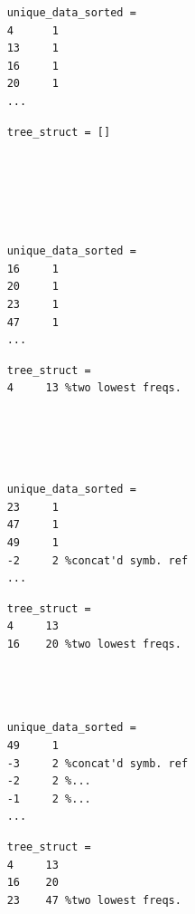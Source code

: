 \documentclass[12pt]{article}
\begin{document}
\begin{figure}[H]
\begin{minipage}{0.5\textwidth}
\begin{verbatim}
	unique_data_sorted =
	4      1
	13     1
	16     1
	20     1
	...
	\end{verbatim}
\end{minipage}
\begin{minipage}{0.5\textwidth}
\begin{verbatim}
	tree_struct = []
	
	
	
	
	
\end{verbatim}
\end{minipage}
\begin{minipage}{0.5\textwidth}
	\centering
	\begin{verbatim}
	unique_data_sorted =
	16     1
	20     1
	23     1
	47     1
	...
	\end{verbatim}
\end{minipage}
\begin{minipage}{0.5\textwidth}
	\centering
	\begin{verbatim}
	tree_struct = 
	4     13 %two lowest freqs.
	
	
	
	
	\end{verbatim}
\end{minipage}
\begin{minipage}{0.5\textwidth}
	\centering
	\begin{verbatim}
	unique_data_sorted =
	23     1
	47     1
	49     1
	-2     2 %concat'd symb. ref
	...
	\end{verbatim}
\end{minipage}
\begin{minipage}{0.5\textwidth}
	\centering
	\begin{verbatim}
	tree_struct = 
	4     13	
	16    20 %two lowest freqs.
	
	
	
	\end{verbatim}
\end{minipage}
\begin{minipage}{0.5\textwidth}
	\centering
	\begin{verbatim}
	unique_data_sorted =
	49     1
	-3     2 %concat'd symb. ref
	-2     2 %...
	-1     2 %...
	...
	\end{verbatim}
\end{minipage}
\begin{minipage}{0.5\textwidth}
	\centering
	\begin{verbatim}
	tree_struct = 
	4     13	
	16    20
	23    47 %two lowest freqs.
	

\end{verbatim}
\end{minipage}
\end{figure}
\end{document}
